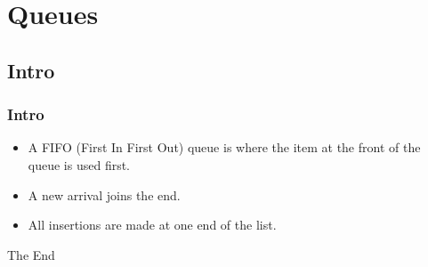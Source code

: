 \documentclass{beamer}
\begin{document}
\section{Queues}
\subsection{Intro}
\begin{frame}
\frametitle{Intro}
\begin{itemize}
\item A {\color{green}FIFO (First In First Out)} queue is where the item at the front of the queue is used first.
\item A new arrival joins the end.
\item All insertions are made at one end of the list.
\end{itemize}
\end{frame}

\begin{frame} 
\Huge{\centerline{The End}}
\end{frame}
\end{document}
